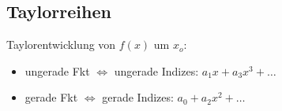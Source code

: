 \subsection{Taylorreihen}
    Taylorentwicklung von $f(x)$ um $x_o$:
    \begin{itemize}
    \item ungerade Fkt $\Leftrightarrow$ ungerade Indizes: $a_1x + a_3x^3 + \dots$
    \item gerade Fkt $\Leftrightarrow$ gerade Indizes: $a_0 + a_2x^2 + \dots$
    \end{itemize}